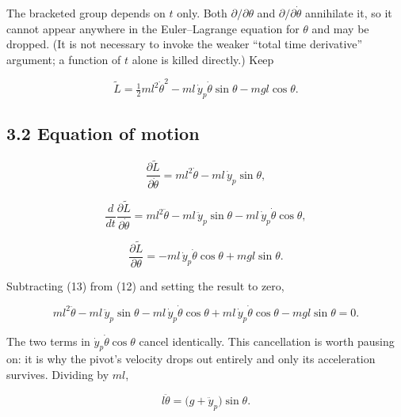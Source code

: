 \documentclass[11pt,a4paper]{article}
\newcommand{\tagmark}[1]{\marginnote{\scriptsize\ttfamily #1}}
\newcommand{\Dtag}{\tagmark{[D]}}   %
\begin{document}
\Dtag{} The bracketed group depends on \(t\) only. Both \(\partial/\partial\theta\)
and \(\partial/\partial\dot\theta\) annihilate it, so it cannot appear anywhere in
the Euler--Lagrange equation for \(\theta\) and may be dropped. (It is not
necessary to invoke the weaker ``total time derivative'' argument; a function of
\(t\) alone is killed directly.) Keep

\begin{equation}
\tilde L = \tfrac12 m l^2\dot\theta^2
      - m l\,\dot y_p\dot\theta\sin\theta - mgl\cos\theta. \tag{10}
\end{equation}

\hypertarget{equation-of-motion}{%
\subsection{3.2 Equation of motion}\label{equation-of-motion}}

\begin{equation}
\frac{\partial\tilde L}{\partial\dot\theta}
   = m l^2\dot\theta - m l\,\dot y_p\sin\theta, \tag{11}
\end{equation}

\begin{equation}
\frac{d}{dt}\frac{\partial\tilde L}{\partial\dot\theta}
   = m l^2\ddot\theta - m l\,\ddot y_p\sin\theta
     - m l\,\dot y_p\dot\theta\cos\theta, \tag{12}
\end{equation}

\begin{equation}
\frac{\partial\tilde L}{\partial\theta}
   = - m l\,\dot y_p\dot\theta\cos\theta + mgl\sin\theta. \tag{13}
\end{equation}

Subtracting (13) from (12) and setting the result to zero,

\begin{equation}
m l^2\ddot\theta - m l\,\ddot y_p\sin\theta
  - m l\,\dot y_p\dot\theta\cos\theta
  + m l\,\dot y_p\dot\theta\cos\theta
  - mgl\sin\theta = 0. \tag{14}
\end{equation}

\Dtag{} The two terms in \(\dot y_p\dot\theta\cos\theta\) cancel identically. This
cancellation is worth pausing on: it is why the pivot's velocity drops out
entirely and only its acceleration survives. Dividing by \(ml\),

\begin{equation}
l\ddot\theta = \bigl(g+\ddot y_p\bigr)\sin\theta. \tag{15}
\end{equation}
\end{document}
